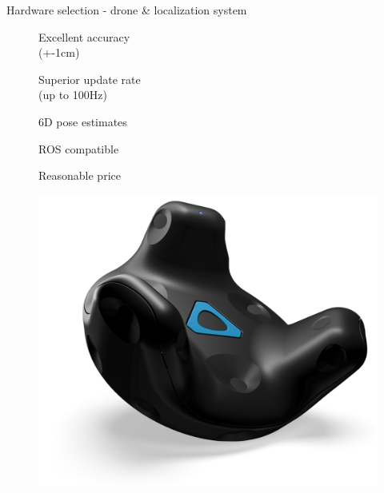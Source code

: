 \begin{frame}{Hardware selection - drone \& localization system}
                \begin{figure}[H]
                \centering
                \begin{minipage}{.40\textwidth}
                    \bit[label=\raisebox{0.25ex}{\tiny$\bullet$}]
                        \item Excellent accuracy\\ (+-1cm)
                        \item Superior update rate\\ (up to 100Hz)
                        \item 6D pose estimates
                        \item ROS compatible
                        \item Reasonable price
                    \eit
                \end{minipage} \hspace{20mm}
                \begin{minipage}{0.25\textwidth}
                    \centering
                    \includegraphics[width=\textwidth]{Figures/vive-tracker.png}
                    \label{fig:tracker}
                \end{minipage}
            \end{figure}

    \eit
 
\end{frame}